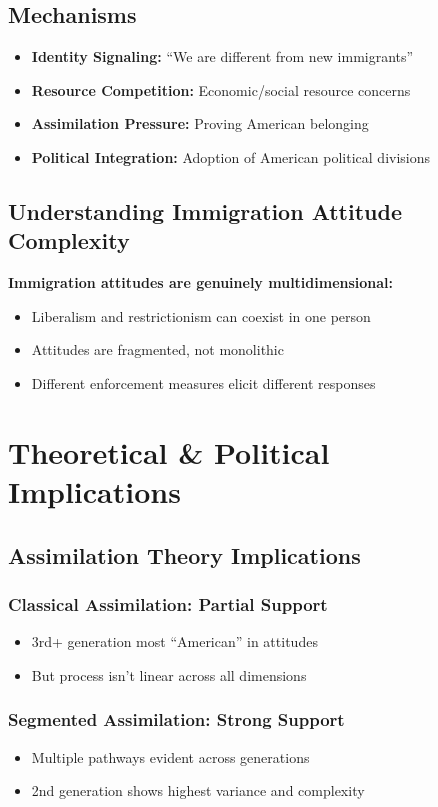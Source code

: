 \documentclass[11pt,letterpaper]{article}
\begin{document}
\subsection{Mechanisms}
\begin{itemize}
    \item \textbf{Identity Signaling:} ``We are different from new immigrants''
    \item \textbf{Resource Competition:} Economic/social resource concerns
    \item \textbf{Assimilation Pressure:} Proving American belonging
    \item \textbf{Political Integration:} Adoption of American political divisions
\end{itemize}

\subsection{Understanding Immigration Attitude Complexity}
\textbf{Immigration attitudes are genuinely multidimensional:}
\begin{itemize}
    \item Liberalism and restrictionism can coexist in one person
    \item Attitudes are fragmented, not monolithic
    \item Different enforcement measures elicit different responses
\end{itemize}

\section{Theoretical \& Political Implications}

\subsection{Assimilation Theory Implications}

\subsubsection{Classical Assimilation: Partial Support}
\begin{itemize}
    \item 3rd+ generation most ``American'' in attitudes
    \item But process isn't linear across all dimensions
\end{itemize}

\subsubsection{Segmented Assimilation: Strong Support}
\begin{itemize}
    \item Multiple pathways evident across generations
    \item 2nd generation shows highest variance and complexity
\end{itemize}
\end{document}
